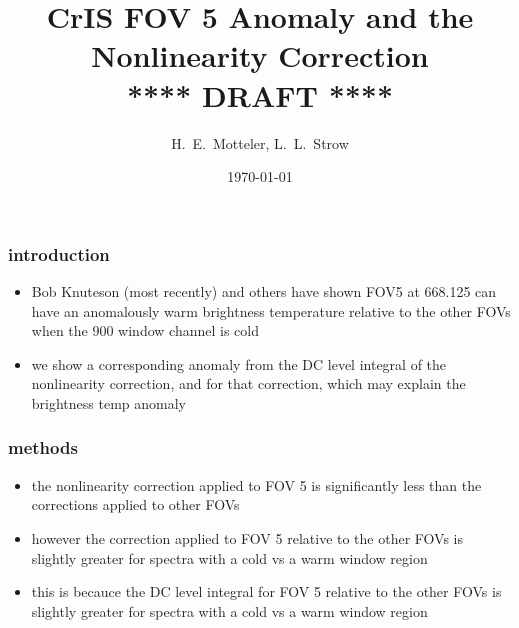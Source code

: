 \documentclass[11pt]{beamer}
\title{CrIS FOV 5 Anomaly and the \\
       Nonlinearity Correction \\
  \vspace{4mm}
  {****} DRAFT {****} \\
}
\author{H.~E.~Motteler, L.~L.~Strow}
\institute{
  UMBC Atmospheric Spectroscopy Lab \\
  Joint Center for Earth Systems Technology \\
}
\date{\today}
\begin{document}
\begin{frame}[plain]
\titlepage
\end{frame}
\begin{frame}
\frametitle{introduction}

\begin{itemize}

  \item Bob Knuteson (most recently) and others have shown FOV5 at
    668.125 \wn can have an anomalously warm brightness temperature
    relative to the other FOVs when the 900 \wn window channel is
    cold

  \item we show a corresponding anomaly from the DC level integral
    of the nonlinearity correction, and for that correction, which
    may explain the brightness temp anomaly

\end{itemize}

\end{frame}
\begin{frame}
\frametitle{methods}

\begin{itemize}

  \item the nonlinearity correction applied to FOV 5 is
    significantly less than the corrections applied to other FOVs

  \item however the correction applied to FOV 5 relative to the
    other FOVs is slightly greater for spectra with a cold vs a warm
    window region

  \item this is becauce the DC level integral for FOV 5 relative to
    the other FOVs is slightly greater for spectra with a cold vs a
    warm window region

\end{itemize}

\end{frame}
\end{document}

